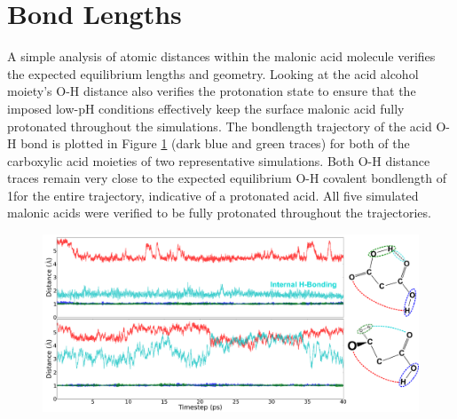 \section{Bond Lengths}

A simple analysis of atomic distances within the malonic acid molecule verifies the expected equilibrium lengths and geometry. Looking at the acid alcohol moiety's O-H distance also verifies the protonation state to ensure that the imposed low-pH conditions effectively keep the surface malonic acid fully protonated throughout the simulations. The bondlength trajectory of the acid O-H bond is plotted in Figure \ref{fig:bondlength-trajectory} (dark blue and green traces) for both of the carboxylic acid moieties of two representative simulations. Both O-H distance traces remain very close to the expected equilibrium O-H covalent bondlength of 1\angs for the entire trajectory, indicative of a protonated acid. All five simulated malonic acids were verified to be fully protonated throughout the trajectories.

\begin{figure}[h!]
	\begin{center}
		\includegraphics[scale=1.0]{images/bond-length/bondlengths.png}
		\caption{}
		\label{fig:bondlength-trajectory}
	\end{center}
\end{figure}

